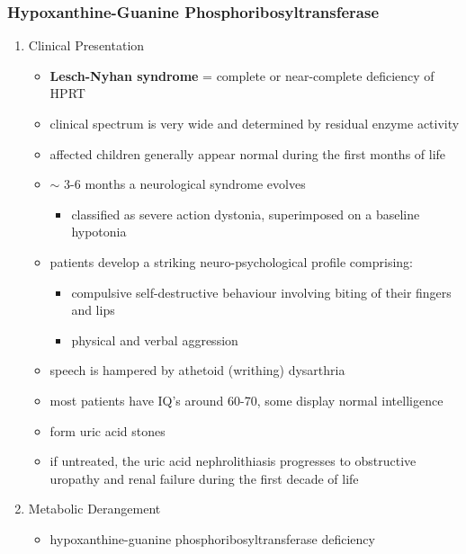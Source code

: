 \documentclass[12pt]{scrartcl}
\begin{document}
\subsubsection{Hypoxanthine-Guanine Phosphoribosyltransferase}
\label{sec:orgee5d0e6}
\begin{enumerate}
\item Clinical Presentation
\label{sec:orga1fab15}
\begin{itemize}
\item \textbf{Lesch-Nyhan syndrome} = complete or near-complete deficiency of HPRT
\item clinical spectrum is very wide and determined by residual enzyme activity
\item affected children generally appear normal during the first months of
life
\item \(\sim\) 3-6 months a neurological syndrome evolves
\begin{itemize}
\item classified as severe action dystonia, superimposed on a baseline hypotonia
\end{itemize}
\item patients develop a striking neuro-psychological profile comprising:
\begin{itemize}
\item compulsive self-destructive behaviour involving biting of their
fingers and lips
\item physical and verbal aggression
\end{itemize}
\item speech is hampered by athetoid (writhing) dysarthria
\item most patients have IQ’s around 60-70, some display normal intelligence
\item form uric acid stones
\item if untreated, the uric acid nephrolithiasis progresses to
obstructive uropathy and renal failure during the first decade of
life
\end{itemize}

\item Metabolic Derangement
\label{sec:orgdda7921}
\begin{itemize}
\item hypoxanthine-guanine phosphoribosyltransferase deficiency
\end{itemize}




\end{enumerate}
\end{document}
